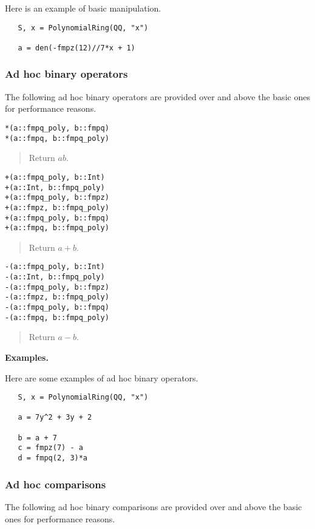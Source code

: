 \documentclass[a4paper,10pt]{article}
\newcommand{\desc}[1]{\vspace{-3mm}\begin{quote}#1\end{quote}}
\begin{document}
{{Here is an example of basic manipulation.

\begin{lstlisting}
   S, x = PolynomialRing(QQ, "x")

   a = den(-fmpz(12)//7*x + 1)
\end{lstlisting}

\subsubsection{Ad hoc binary operators}

The following ad hoc binary operators are provided over and above the basic ones
for performance reasons.

\begin{lstlisting}
*(a::fmpq_poly, b::fmpq)
*(a::fmpq, b::fmpq_poly)
\end{lstlisting}

\desc{Return $ab$.}

\begin{lstlisting}
+(a::fmpq_poly, b::Int)
+(a::Int, b::fmpq_poly)
+(a::fmpq_poly, b::fmpz)
+(a::fmpz, b::fmpq_poly)
+(a::fmpq_poly, b::fmpq)
+(a::fmpq, b::fmpq_poly)
\end{lstlisting}

\desc{Return $a + b$.}

\begin{lstlisting}
-(a::fmpq_poly, b::Int)
-(a::Int, b::fmpq_poly)
-(a::fmpq_poly, b::fmpz)
-(a::fmpz, b::fmpq_poly)
-(a::fmpq_poly, b::fmpq)
-(a::fmpq, b::fmpq_poly)
\end{lstlisting}

\desc{Return $a - b$.}

\textbf{Examples.}

Here are some examples of ad hoc binary operators.

\begin{lstlisting}
   S, x = PolynomialRing(QQ, "x")

   a = 7y^2 + 3y + 2

   b = a + 7
   c = fmpz(7) - a
   d = fmpq(2, 3)*a
\end{lstlisting}

\subsubsection{Ad hoc comparisons}

The following ad hoc binary comparisons are provided over and above the basic ones
for performance reasons.

}}
\end{document}
